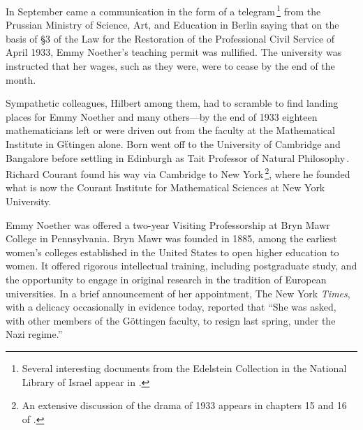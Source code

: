 \documentclass[twoside,symmetric]{tufte-handout}
\begin{document}
In September came a communication in the form of a telegram$\,$\footnote{Several interesting documents from the Edelstein Collection in the National Library of Israel appear in .} from the Prussian Ministry of Science, Art, and Education in Berlin saying that on the basis of \S3 of the Law for the Restoration of the Professional Civil Service of April 1933, Emmy Noether's teaching permit was nullified. The university was instructed that her wages, such as they were, were to cease by the end of the month.

Sympathetic colleagues, Hilbert among them, had to scramble to find landing places for Emmy Noether and many others---by the end of 1933 eighteen mathematicians left or were driven out from the faculty at the Mathematical Institute in G\"ttingen alone.
 Born went off to the University of Cambridge and Bangalore before settling in Edinburgh as Tait Professor of Natural Philosophy$\,$\cite[-24pt]{born1978my}. Richard Courant found his way via Cambridge to New York$\,$\footnote{An extensive discussion of the drama of 1933 appears in chapters 15 and 16 of .}, where he founded what is now the Courant Institute for Mathematical Sciences at New York University.

 Emmy Noether was offered a two-year Visiting Professorship at Bryn Mawr College in Pennsylvania.
 Bryn Mawr was founded in 1885, among the earliest women's colleges established in the United States to open higher education to women. It offered rigorous intellectual training, including postgraduate study, and the opportunity to engage in original research in the tradition of European universities.
 In a brief announcement of her appointment, The New York \emph{Times}, with a delicacy occasionally in evidence today, reported that ``She was asked, with other members of the G\"ottingen faculty, to resign last spring, under the Nazi regime.''$\,$\cite[]{nyt1933}
\end{document}

